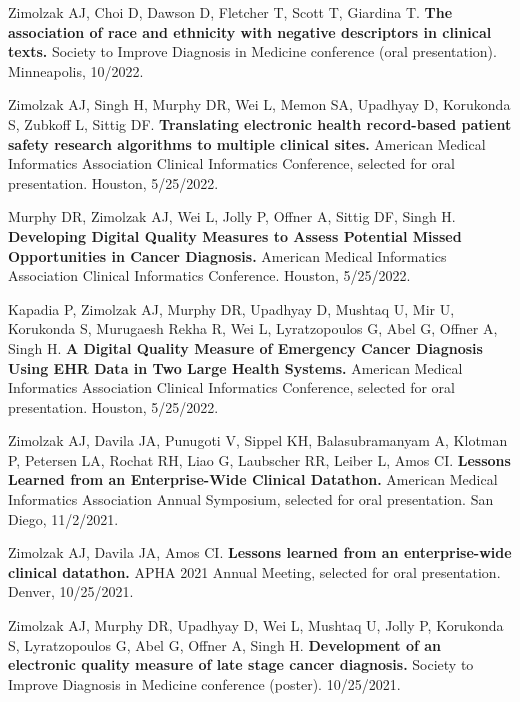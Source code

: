 \documentclass[10pt]{article}
\begin{document}
Zimolzak AJ, Choi D, Dawson D, Fletcher T, Scott T, Giardina T.
\textbf{The association of race and ethnicity with negative
  descriptors in clinical texts.} Society to Improve Diagnosis in
Medicine conference (oral presentation). Minneapolis, 10/2022.



Zimolzak AJ, Singh H, Murphy DR, Wei L, Memon SA, Upadhyay D,
Korukonda S, Zubkoff L, Sittig DF. \textbf{Translating electronic
  health record-based patient safety research algorithms to multiple
  clinical sites.} American Medical Informatics Association Clinical
Informatics Conference, selected for oral presentation. Houston,
5/25/2022.

Murphy DR, Zimolzak AJ, Wei L, Jolly P, Offner A, Sittig DF, Singh H.
\textbf{Developing Digital Quality Measures to Assess Potential Missed
  Opportunities in Cancer Diagnosis.} American Medical Informatics
Association Clinical Informatics Conference. Houston, 5/25/2022.

Kapadia P, Zimolzak AJ, Murphy DR, Upadhyay D, Mushtaq U, Mir U,
Korukonda S, Murugaesh Rekha R, Wei L, Lyratzopoulos G, Abel G, Offner
A, Singh H. \textbf{A Digital Quality Measure of Emergency Cancer
  Diagnosis Using EHR Data in Two Large Health Systems.} American
Medical Informatics Association Clinical Informatics Conference,
selected for oral presentation. Houston, 5/25/2022.



Zimolzak AJ, Davila JA, Punugoti V, Sippel KH, Balasubramanyam A,
Klotman P, Petersen LA, Rochat RH, Liao G, Laubscher RR, Leiber L,
Amos CI. \textbf{Lessons Learned from an Enterprise-Wide Clinical
  Datathon.} American Medical Informatics Association Annual
Symposium, selected for oral presentation. San Diego, 11/2/2021.

Zimolzak AJ, Davila JA, Amos CI. \textbf{Lessons learned from an
  enterprise-wide clinical datathon.} APHA 2021 Annual Meeting,
selected for oral presentation. Denver, 10/25/2021.


Zimolzak AJ, Murphy DR, Upadhyay D, Wei L, Mushtaq U, Jolly P,
Korukonda S, Lyratzopoulos G, Abel G, Offner A, Singh H.
\textbf{Development of an electronic quality measure of late stage
  cancer diagnosis.} Society to Improve Diagnosis in Medicine
conference (poster). 10/25/2021.
\end{document}
